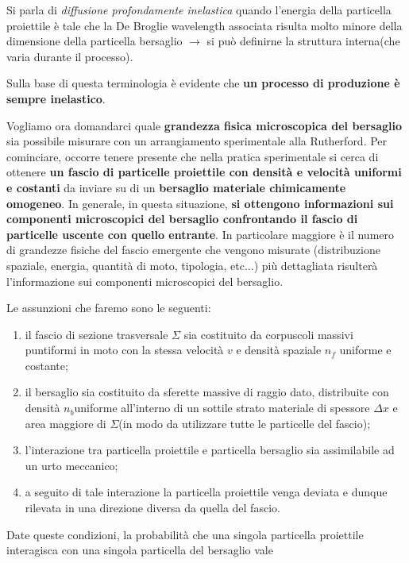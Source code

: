 Si parla di \emph{diffusione profondamente inelastica} quando l'energia
della particella proiettile è tale che la De Broglie wavelength
associata risulta molto minore della dimensione della particella
bersaglio \(\rightarrow\) si può definirne la struttura interna(che
varia durante il processo).

Sulla base di questa terminologia è evidente che \textbf{un processo di
produzione è sempre inelastico}.

Vogliamo ora domandarci quale \textbf{grandezza fisica microscopica del
bersaglio} sia possibile misurare con un arrangiamento sperimentale alla
Rutherford.
Per cominciare, occorre tenere presente che nella pratica
sperimentale si cerca di ottenere \textbf{un fascio di particelle
proiettile con densità e velocità uniformi e costanti} da inviare su di
un \textbf{bersaglio materiale chimicamente omogeneo}.
In generale, in
questa situazione, \textbf{si ottengono informazioni sui componenti
microscopici del bersaglio confrontando il fascio di particelle uscente
con quello entrante}.
In particolare maggiore è il numero di grandezze
fisiche del fascio emergente che vengono misurate (distribuzione
spaziale, energia, quantità di moto, tipologia, etc...) più
dettagliata risulterà l'informazione sui componenti microscopici del
bersaglio.

Le assunzioni che faremo sono le seguenti:

\begin{enumerate}
	\tightlist
	\item
	il fascio di sezione trasversale \(\Sigma\) sia costituito da
	corpuscoli massivi puntiformi in moto con la stessa velocità \(v\) e
	densità spaziale \(n_f\) uniforme e costante;
	\item
	il bersaglio sia costituito da sferette massive di raggio dato,
	distribuite con densità \(n_b\)uniforme all'interno di un sottile
	strato materiale di spessore \(\Delta x\) e area maggiore di
	\(\Sigma\)(in modo da utilizzare tutte le particelle del fascio);
	\item
	l'interazione tra particella proiettile e particella bersaglio sia
	assimilabile ad un urto meccanico;
	\item
	a seguito di tale interazione la particella proiettile venga deviata e
	dunque rilevata in una direzione diversa da quella del fascio.
\end{enumerate}
Date queste condizioni, la probabilità che una singola particella
proiettile interagisca con una singola particella del bersaglio vale

